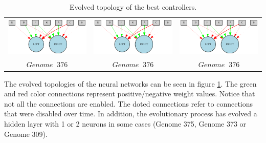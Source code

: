 \begin{table}[h]
\begin{tabular}{ccc}
\includegraphics[scale=0.4]{include/images/sim_network_1.PNG} & \includegraphics[scale=0.4]{include/images/sim_network_1.PNG} & \includegraphics[scale=0.4]{include/images/sim_network_1.PNG} \\
$Genome \;  \; 376$  & $Genome \;  \; 376$  & $Genome \;  \; 376$ \\
\end{tabular}
\caption{Evolved topology of the best controllers.}
\label{fig:sim_network_topologies} %
\end{table}

The evolved topologies of the neural networks can be seen in figure \ref{fig:sim_network_topologies}. The green and red color connections represent positive/negative weight values. Notice that not all the connections are enabled. The doted connections refer to connections that were disabled over time. In addition, the evolutionary process has evolved a hidden layer with 1 or 2 neurons in some cases (Genome 375, Genome 373 or Genome 309).

